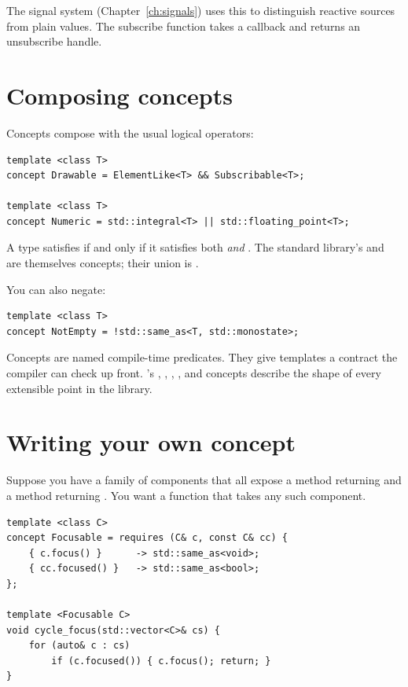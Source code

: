 The signal system (Chapter~\ref{ch:signals}) uses this to
distinguish reactive sources from plain values. The subscribe
function takes a callback and returns an unsubscribe handle.

\section{Composing concepts}

Concepts compose with the usual logical operators:

\begin{lstlisting}
template <class T>
concept Drawable = ElementLike<T> && Subscribable<T>;

template <class T>
concept Numeric = std::integral<T> || std::floating_point<T>;
\end{lstlisting}

A type satisfies  if and only if it satisfies both
 \emph{and} . The standard
library's  and 
are themselves concepts; their union is .

You can also negate:

\begin{lstlisting}
template <class T>
concept NotEmpty = !std::same_as<T, std::monostate>;
\end{lstlisting}

\begin{recap}
Concepts are named compile-time predicates. They give templates a
contract the compiler can check up front. \maya{}'s
, , ,
, and  concepts describe the
shape of every extensible point in the library.
\end{recap}

\section{Writing your own concept}

Suppose you have a family of components that all expose a
 method returning  and a 
method returning . You want a function that takes any
such component.

\begin{lstlisting}
template <class C>
concept Focusable = requires (C& c, const C& cc) {
    { c.focus() }      -> std::same_as<void>;
    { cc.focused() }   -> std::same_as<bool>;
};

template <Focusable C>
void cycle_focus(std::vector<C>& cs) {
    for (auto& c : cs)
        if (c.focused()) { c.focus(); return; }
}
\end{lstlisting}

